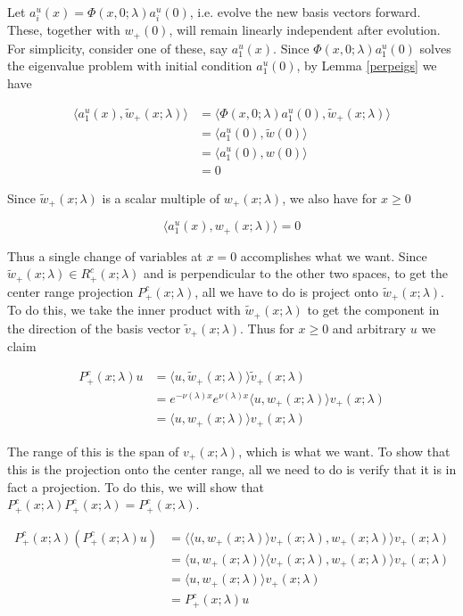 \documentclass[12pt]{article}
\begin{document}
Let $a^u_i(x) = \Phi(x,0; \lambda)a^u_i(0)$, i.e. evolve the new basis vectors forward. These, together with $w_+(0)$, will remain linearly independent after evolution. For simplicity, consider one of these, say $a^u_1(x)$. Since $\Phi(x,0; \lambda) a^u_1(0)$ solves the eigenvalue problem with initial condition $a^u_1(0)$, by Lemma \ref{perpeigs} we have

\begin{align*}
\langle a^u_1(x), \tilde{w}_+(x; \lambda) \rangle &= \langle \Phi(x,0; \lambda) a^u_1(0), \tilde{w}_+(x; \lambda) \rangle \\
&= \langle a^u_1(0), \tilde{w}(0) \rangle \\
&= \langle a^u_1(0), w(0) \rangle \\
&= 0
\end{align*}

Since $\tilde{w}_+(x; \lambda)$ is a scalar multiple of $w_+(x; \lambda)$, we also have for $x \geq 0$

\[
\langle a^u_1(x), w_+(x; \lambda) \rangle = 0
\]

Thus a single change of variables at $x = 0$ accomplishes what we want. Since $\tilde{w}_+(x; \lambda) \in R^c_+(x; \lambda)$ and is perpendicular to the other two spaces, to get the center range projection $P^c_+(x; \lambda)$, all we have to do is project onto $\tilde{w}_+(x; \lambda)$. To do this, we take the inner product with $\tilde{w}_+(x; \lambda)$ to get the component in the direction of the basis vector $\tilde{v}_+(x; \lambda)$. Thus for $x \geq 0$ and arbitrary $u$ we claim

\begin{align*}
P^c_+(x; \lambda)u &= \langle u, \tilde{w}_+(x; \lambda) \rangle \tilde{v}_+(x; \lambda) \\
&= e^{-\nu(\lambda)x} e^{\nu(\lambda) x }\langle u, w_+(x; \lambda) \rangle v_+(x; \lambda) \\
&= \langle u, w_+(x; \lambda) \rangle v_+(x; \lambda)
\end{align*}

The range of this is the span of $v_+(x; \lambda)$, which is what we want. To show that this is the projection onto the center range, all we need to do is verify that it is in fact a projection. To do this, we will show that $P^c_+(x; \lambda)P^c_+(x; \lambda) = P^c_+(x; \lambda)$.

\begin{align*}
P^c_+(x; \lambda)( P^c_+(x; \lambda) u ) &= \langle \langle u, w_+(x; \lambda) \rangle v_+(x; \lambda), w_+(x; \lambda) \rangle v_+(x; \lambda) \\
&= \langle u, w_+(x; \lambda) \rangle \langle v_+(x; \lambda), w_+(x; \lambda) \rangle v_+(x; \lambda) \\
&= \langle u, w_+(x; \lambda) \rangle v_+(x; \lambda) \\
&= P^c_+(x; \lambda) u 
\end{align*}
\end{document}
